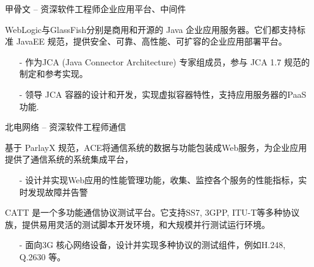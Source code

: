 \documentclass[10pt,a4paper]{moderncv}
\begin{document}
{ 甲骨文 -- 资深软件工程师}{企业应用平台、中间件}{}{}{}
\vspace{1ex}
{
  WebLogic与GlassFish分别是商用和开源的 Java 企业应用服务器。它们都支持标准 JavaEE 规范，提供安全、可靠、高性能、可扩容的企业应用部署平台。
  \begin{itemize}
    \item[-] 作为JCA (Java Connector Architecture) 专家组成员，参与 JCA 1.7 规范的制定和参考实现。
    \item[-] 领导 JCA 容器的设计和开发，实现虚拟容器特性，支持应用服务器的PaaS功能.
  \end{itemize}
}

\vspace{2ex}
\vspace*{0.4\baselineskip}

{北电网络 -- 资深软件工程师}{通信}{}{}{}
{
  基于 ParlayX 规范，ACE将通信系统的数据与功能包装成Web服务，为企业应用提供了通信系统的系统集成平台，
  \begin{itemize}
    \item[-] 设计并实现Web应用的性能管理功能，收集、监控各个服务的性能指标，实时发现故障并告警 \end{itemize}
}

\vspace*{0.2\baselineskip}
{
  CATT 是一个多功能通信协议测试平台。它支持SS7, 3GPP, ITU-T等多种协议族，提供易用灵活的测试脚本开发环境，和大规模并行测试运行环境。
  \begin{itemize}
    \item[-] 面向3G 核心网络设备，设计并实现多种协议的测试组件，例如H.248, Q.2630 等。
  \end{itemize}
}
\end{document}

